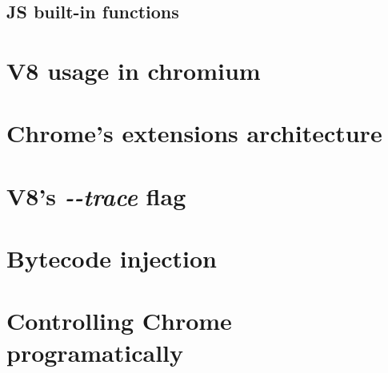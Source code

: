 \subsection{JS built-in functions}
\label{v8-builtins}

\section{V8 usage in chromium}
\label{v8-in-chrome}

\section{Chrome's extensions architecture}
\section{V8's \emph{-{}-trace} flag}
\section{Bytecode injection}
\section{Controlling Chrome programatically}

